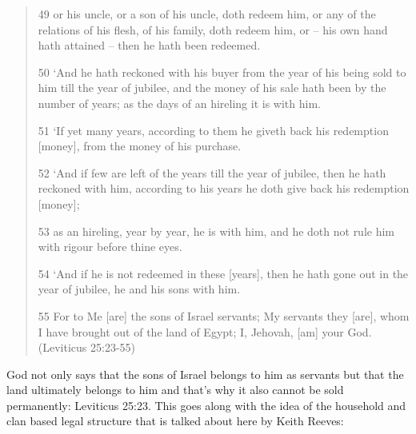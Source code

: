 \documentclass[11pt]{article}
\begin{document}
\begin{quote}
49 or his uncle, or a son of his uncle, doth redeem him, or any of the relations of his flesh, of his family, doth redeem him, or -- his own hand hath attained -- then he hath been redeemed.

50 `And he hath reckoned with his buyer from the year of his being sold to him till the year of jubilee, and the money of his sale hath been by the number of years; as the days of an hireling it is with him.

51 `If yet many years, according to them he giveth back his redemption [money], from the money of his purchase.

52 `And if few are left of the years till the year of jubilee, then he hath reckoned with him, according to his years he doth give back his redemption [money];

53 as an hireling, year by year, he is with him, and he doth not rule him with rigour before thine eyes.

54 `And if he is not redeemed in these [years], then he hath gone out in the year of jubilee, he and his sons with him.

55 For to Me [are] the sons of Israel servants; My servants they [are], whom I have brought out of the land of Egypt; I, Jehovah, [am] your God. (Leviticus 25:23-55)
\end{quote} 

God not only says that the sons of Israel belongs to him as servants but that the land ultimately belongs to him and that's why it also cannot be sold permanently: Leviticus 25:23. This goes along with the idea of the household and clan based legal structure that is talked about here by Keith Reeves:
\end{document}
